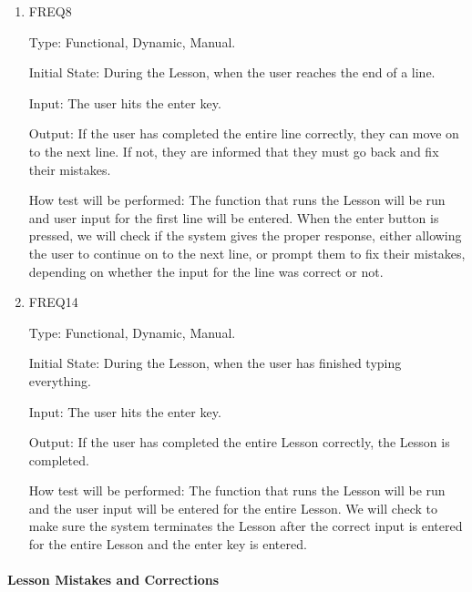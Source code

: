 \documentclass[12pt, titlepage]{article}
\begin{document}
\begin{enumerate}
\item{FREQ8\\}

Type: Functional, Dynamic, Manual.
					
Initial State: During the Lesson, when the user reaches the end of a line.
					
Input: The user hits the enter key.
					
Output: If the user has completed the entire line correctly, they can move on to the next line. If not, they are informed that they must go back and fix their mistakes.
					
How test will be performed: The function that runs the Lesson will be run and user input for the first line will be entered. When the enter button is pressed, we will check if the system gives the proper response, either allowing the user to continue on to the next line, or prompt them to fix their mistakes, depending on whether the input for the line was correct or not.

\item{FREQ14\\}

Type: Functional, Dynamic, Manual.
					
Initial State: During the Lesson, when the user has finished typing everything.
					
Input: The user hits the enter key.
					
Output: If the user has completed the entire Lesson correctly, the Lesson is completed.
					
How test will be performed: The function that runs the Lesson will be run and the user input will be entered for the entire Lesson. We will check to make sure the system terminates the Lesson after the correct input is entered for the entire Lesson and the enter key is entered.

\end{enumerate}

\paragraph{Lesson Mistakes and Corrections}
\end{document}
